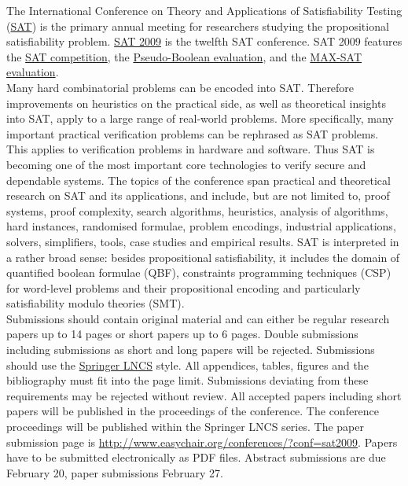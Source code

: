 \documentclass[10pt]{article}
\begin{document}
\hspace*{0.35cm}
\begin{minipage}[t]{9.25cm}
  \begin{minipage}[t]{9.25cm}
    \vspace*{0.15cm}
  {\small
  The International Conference on Theory and Applications of
  Satisfiability Testing (\href{http://www.satisfiability.org}{SAT})
  is the primary annual meeting for researchers studying the
  propositional satisfiability
  problem. \href{http://cs-svr1.swan.ac.uk/~csoliver/SAT2009}{SAT
    2009} is the twelfth SAT conference. SAT 2009 features the
  \href{http://www.satcompetition.org/2009}{SAT competition}, the
  \href{http://www.cril.univ-artois.fr/PB09}{Pseudo-Boolean evaluation}, and the
  \href{http://www.maxsat.udl.cat/09/}{MAX-SAT evaluation}. \\[0.1cm]
%
  Many hard combinatorial problems can be encoded into
  SAT. Therefore improvements on heuristics on the practical side, as
  well as theoretical insights into SAT, apply to a large range of
  real-world problems. More specifically, many important practical
  verification problems can be rephrased as SAT problems. This
  applies to verification problems in hardware and software. Thus SAT
  is becoming one of the most important core technologies to verify
  secure and dependable systems. The topics of the conference span
  practical and theoretical research on SAT and its applications, and
  include, but are not limited to, proof systems, proof complexity,
  search algorithms, heuristics, analysis of algorithms, hard
  instances, randomised formulae, problem encodings, industrial
  applications, solvers, simplifiers, tools, case studies and
  empirical results. SAT is interpreted in a rather broad sense:
  besides propositional satisfiability, it includes the domain
  of quantified boolean formulae (QBF), constraints programming
  techniques (CSP) for word-level problems and their propositional
  encoding and particularly satisfiability modulo theories (SMT). \\[0.1cm]
%
  Submissions should contain original material and can either be
  regular research papers up to 14 pages or short papers up to 6
  pages. Double submissions including submissions as short and long
  papers will be rejected.  Submissions should use the 
  \href{http://www.springer.com/comp/lncs/Authors.html}{Springer LNCS}
  style. All appendices, tables, figures and the bibliography 
  must fit into the page limit. Submissions deviating from these
  requirements may be rejected without review. All accepted papers
  including short papers will be published in the proceedings of the
  conference. The conference proceedings will be published within
  the Springer LNCS series. The paper submission page is
  \url{http://www.easychair.org/conferences/?conf=sat2009}. Papers have to
  be submitted electronically as PDF files. Abstract submissions are due
  February 20, paper submissions February 27.
  }
  \end{minipage}


\end{minipage}
\end{document}
